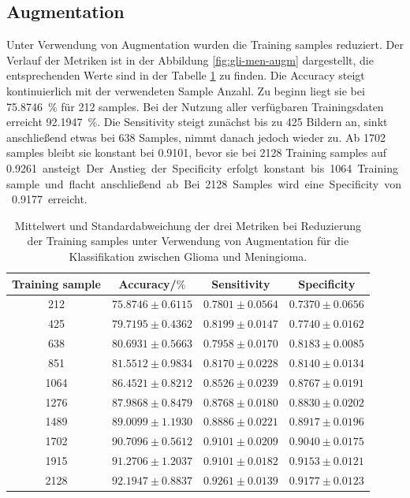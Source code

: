 \subsection{Augmentation}
Unter Verwendung von Augmentation wurden die Training samples reduziert.
Der Verlauf der Metriken ist in der Abbildung \ref{fig:gli-men-augm} dargestellt,
die entsprechenden Werte sind in der Tabelle \ref{tab:gli-men-augm} zu finden.
Die Accuracy steigt kontinuierlich mit der verwendeten Sample Anzahl.
Zu beginn liegt sie bei \SI{75.8746}{\percent} für 212 samples. 
Bei der Nutzung aller verfügbaren Trainingsdaten erreicht \SI{92.1947}{\percent}.
Die Sensitivity steigt zunächst bis zu 425 Bildern an, sinkt anschließend etwas bei 638 Samples, nimmt danach jedoch wieder zu.
Ab 1702 samples bleibt sie konstant bei \SI{0.9101}{}, bevor sie bei 2128 Training samples auf \SI{0.9261} ansteigt. 
Der Anstieg der Specificity erfolgt konstant bis 1064 Training sample und flacht anschließend ab.
Bei 2128 Samples wird eine Specificity von \SI{0.9177}{} erreicht.
\begin{table}[H]
    \centering
    {\small
        \begin{tabular}{cccc}
            \toprule
            Training sample & Accuracy/$\%$ & Sensitivity & Specificity\\
            \midrule
            212  & $75.8746 \pm 0.6115$ & $0.7801 \pm 0.0564$ & $0.7370 \pm 0.0656$ \\
            425  & $79.7195 \pm 0.4362$ & $0.8199 \pm 0.0147$ & $0.7740 \pm 0.0162$ \\
            638  & $80.6931 \pm 0.5663$ & $0.7958 \pm 0.0170$ & $0.8183 \pm 0.0085$ \\
            851  & $81.5512 \pm 0.9834$ & $0.8170 \pm 0.0228$ & $0.8140 \pm 0.0134$ \\
            1064 & $86.4521 \pm 0.8212$ & $0.8526 \pm 0.0239$ & $0.8767 \pm 0.0191$ \\
            1276 & $87.9868 \pm 0.8479$ & $0.8768 \pm 0.0180$ & $0.8830 \pm 0.0202$ \\
            1489 & $89.0099 \pm 1.1930$ & $0.8886 \pm 0.0221$ & $0.8917 \pm 0.0196$ \\
            1702 & $90.7096 \pm 0.5612$ & $0.9101 \pm 0.0209$ & $0.9040 \pm 0.0175$ \\
            1915 & $91.2706 \pm 1.2037$ & $0.9101 \pm 0.0182$ & $0.9153 \pm 0.0121$ \\
            2128 & $92.1947 \pm 0.8837$ & $0.9261 \pm 0.0139$ & $0.9177 \pm 0.0123$ \\         
            \bottomrule
        \end{tabular}}
  \caption{Mittelwert und Standardabweichung der drei Metriken bei Reduzierung der Training samples unter Verwendung von Augmentation für die Klassifikation zwischen Glioma und Meningioma.}
  \label{tab:gli-men-augm}
\end{table}
